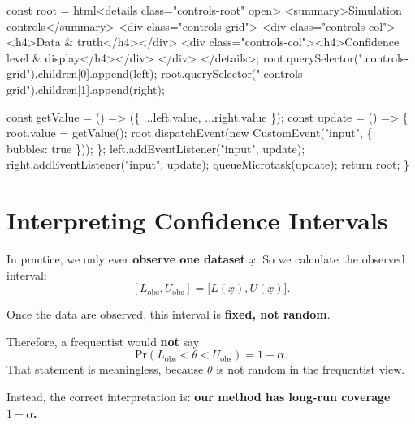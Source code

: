 \documentclass[
  letterpaper,
  DIV=11,
  numbers=noendperiod]{scrreprt}
\newenvironment{Shaded}{\begin{snugshade}}{\end{snugshade}}
\newcommand{\NormalTok}[1]{\textcolor[rgb]{0.00,0.23,0.31}{#1}}
\theoremstyle{definition}
\theoremstyle{plain}
\theoremstyle{definition}
\theoremstyle{remark}
\begin{document}
\begin{Shaded}
\begin{Highlighting}[]
\NormalTok{  const root = html\textasciigrave{}\textless{}details class="controls{-}root" open\textgreater{}}
\NormalTok{    \textless{}summary\textgreater{}Simulation controls\textless{}/summary\textgreater{}}
\NormalTok{    \textless{}div class="controls{-}grid"\textgreater{}}
\NormalTok{      \textless{}div class="controls{-}col"\textgreater{}\textless{}h4\textgreater{}Data \& truth\textless{}/h4\textgreater{}\textless{}/div\textgreater{}}
\NormalTok{      \textless{}div class="controls{-}col"\textgreater{}\textless{}h4\textgreater{}Confidence level \& display\textless{}/h4\textgreater{}\textless{}/div\textgreater{}}
\NormalTok{    \textless{}/div\textgreater{}}
\NormalTok{  \textless{}/details\textgreater{}\textasciigrave{};}
\NormalTok{  root.querySelector(".controls{-}grid").children[0].append(left);}
\NormalTok{  root.querySelector(".controls{-}grid").children[1].append(right);}

\NormalTok{  const getValue = () =\textgreater{} (\{ ...left.value, ...right.value \});}
\NormalTok{  const update = () =\textgreater{} \{ root.value = getValue(); root.dispatchEvent(new CustomEvent("input", \{ bubbles: true \})); \};}
\NormalTok{  left.addEventListener("input", update);}
\NormalTok{  right.addEventListener("input", update);}
\NormalTok{  queueMicrotask(update);}
\NormalTok{  return root;}
\NormalTok{\}}
\end{Highlighting}
\end{Shaded}

\section{Interpreting Confidence
Intervals}\label{interpreting-confidence-intervals}

In practice, we only ever \textbf{observe one dataset}
\(\underline{x}\). So we calculate the observed interval: \[
[L_{\text{obs}}, U_{\text{obs}}] 
= \big[L(\underline{x}), U(\underline{x})\big].
\]

\begin{tcolorbox}[enhanced jigsaw, left=2mm, toprule=.15mm, breakable, opacityback=0, titlerule=0mm, toptitle=1mm, colbacktitle=quarto-callout-important-color!10!white, colframe=quarto-callout-important-color-frame, coltitle=black, rightrule=.15mm, leftrule=.75mm, bottomrule=.15mm, arc=.35mm, bottomtitle=1mm, title=\textcolor{quarto-callout-important-color}{\faExclamation}\hspace{0.5em}{Confidence Interval Interpretation}, colback=white, opacitybacktitle=0.6]

Once the data are observed, this interval is \textbf{fixed, not random}.

Therefore, a frequentist would \textbf{not} say \[
\mathrm{Pr}(L_{\text{obs}} < \theta < U_{\text{obs}}) = 1 - \alpha.
\] That statement is meaningless, because \(\theta\) is not random in
the frequentist view.

Instead, the correct interpretation is: \textbf{our method has long-run
coverage \(1-\alpha\).}

\end{tcolorbox}
\end{document}
